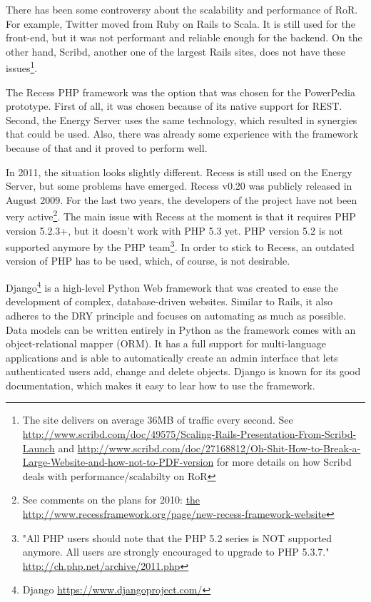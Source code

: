There has been some controversy about the scalability and performance of RoR. For example, Twitter moved from Ruby on Rails to Scala. It is still used for the front-end, but it was not performant and reliable enough for the backend\cite{twitter_ruby_scala}. On the other hand, Scribd, another one of the largest Rails sites, does not have these issues\footnote{The site delivers on average 36MB of traffic every second. See \url{http://www.scribd.com/doc/49575/Scaling-Rails-Presentation-From-Scribd-Launch} and \url{http://www.scribd.com/doc/27168812/Oh-Shit-How-to-Break-a-Large-Website-and-how-not-to-PDF-version} for more details on how Scribd deals with performance/scalabilty on RoR}.

The Recess PHP framework was the option that was chosen for the PowerPedia prototype. First of all, it was chosen because of its native support for REST. Second, the Energy Server uses the same technology, which resulted in synergies that could be used. Also, there was already some experience with the framework because of that and it proved to perform well.

In 2011, the situation looks slightly different. Recess is still used on the Energy Server, but some problems have emerged. Recess v0.20 was publicly released in August 2009. For the last two years, the developers of the project have not been very active\footnote{See comments on the plans for 2010: \url{the http://www.recessframework.org/page/new-recess-framework-website}}. The main issue with Recess at the moment is that it requires PHP version 5.2.3+, but it doesn't work with PHP 5.3 yet. PHP version 5.2 is not supported anymore by the PHP team\footnote{"All PHP users should note that the PHP 5.2 series is NOT supported anymore. All users are strongly encouraged to upgrade to PHP 5.3.7." \url{http://ch.php.net/archive/2011.php}}. In order to stick to Recess, an outdated version of PHP has to be used, which, of course, is not desirable.  

Django\footnote{Django \url{https://www.djangoproject.com/}} is a high-level Python Web framework that was created to ease the development of complex, database-driven websites. Similar to Rails, it also adheres to the DRY principle and focuses on automating as much as possible. Data models can be written entirely in Python as the framework comes with an object-relational mapper (ORM). It has a full support for multi-language applications and is able to automatically create an admin interface that lets authenticated users add, change and delete objects. Django is known for its good documentation, which makes it easy to lear how to use the framework.

